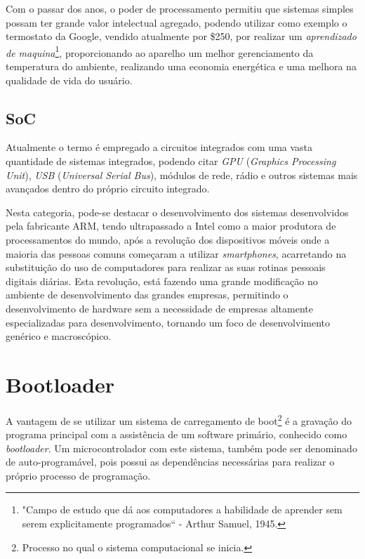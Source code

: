 Com o passar dos anos, o poder de processamento permitiu que sistemas simples possam ter grande valor intelectual agregado, podendo utilizar como exemplo o termostato da Google, vendido atualmente por \$250, por realizar um \textit{aprendizado de maquina}\footnote{"Campo de estudo que dá aos computadores a habilidade de aprender sem serem explicitamente programados`` -  Arthur Samuel, 1945.}, proporcionando ao aparelho um melhor gerenciamento da temperatura do ambiente, realizando uma economia energética e uma melhora na qualidade de vida do usuário.

\subsection{SoC}

Atualmente o termo é empregado a circuitos integrados com uma vasta quantidade de sistemas integrados, podendo citar  \textit{GPU} (\textit{Graphics Processing Unit}), \textit{USB} (\textit{Universal Serial Bus}), módulos de rede, rádio e outros sistemas mais avançados dentro do próprio circuito integrado.


Nesta categoria, pode-se destacar o desenvolvimento dos sistemas desenvolvidos pela fabricante ARM, tendo ultrapassado a Intel como a maior produtora de processamentos do mundo, após a revolução dos dispositivos móveis onde a maioria das pessoas comuns começaram a utilizar \textit{smartphones}, acarretando na substituição do uso de computadores para realizar as suas rotinas pessoais digitais diárias. Esta revolução, está fazendo uma grande modificação no ambiente de desenvolvimento das grandes empresas, permitindo o desenvolvimento de hardware sem a necessidade de empresas altamente especializadas para desenvolvimento, tornando um foco de desenvolvimento genérico e macroscópico.


\section{Bootloader}

A vantagem de se utilizar um sistema de carregamento de boot\footnote{Processo no qual o sistema computacional se inicia.} é
a gravação do programa principal com a assistência de um software primário, conhecido como \textit{bootloader}. Um microcontrolador
com este sistema, também pode ser denominado de auto-programável, pois possui as dependências necessárias para realizar o próprio
processo de programação.

